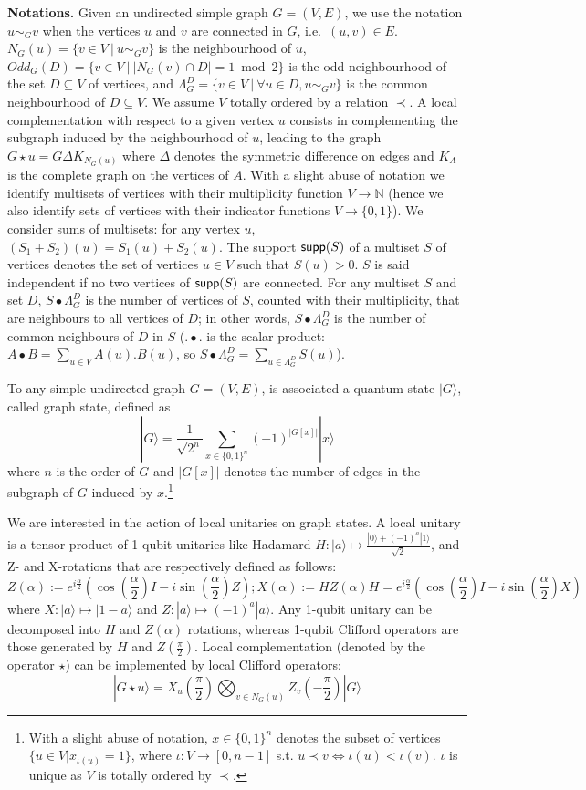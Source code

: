 \documentclass[a4paper,UKenglish,cleveref,autoref,thm-restate]{arxiv}
\newcommand{\ket}[1]{  |{#1} \rangle} \newcommand{\bra}[1]{ \left \langle#1\right | }
\renewcommand{\iff}{\Leftrightarrow}
\newcommand{\supp}{\textup{\textsf{supp}}}
\renewcommand{\iff}{\Leftrightarrow}
\renewcommand{\iff}{\Leftrightarrow}
\begin{document}
{\bf Notations.} Given an undirected simple graph $G=(V,E)$, we use the notation $u\sim_G v$ when the vertices $u$ and $v$ are connected in $G$, i.e.~$(u,v)\in E$. $N_G(u)=\{v\in V~|~u\sim_G v\}$ is the neighbourhood of $u$, $Odd_G(D) = \{v \in V~|~|N_G(v)\cap D|=1\bmod 2\}$ is the odd-neighbourhood of the set $D\subseteq V$ of vertices, and $\Lambda _G^D = \{v\in V~|~ \forall u\in D, u\sim_G v\}$ is the common neighbourhood of $D\subseteq V$. We assume $V$  totally ordered by a relation $\prec$. A local complementation with respect to a given vertex $u$ consists in complementing the subgraph induced by the neighbourhood of $u$, leading to the graph $G\star u= G\Delta K_{N_G(u)}$ where $\Delta$ denotes the symmetric difference on edges and $K_A$ is the complete graph on the vertices of $A$. With a slight abuse of notation we identify multisets of vertices with their multiplicity function $V\to \mathbb N$ (hence we also identify sets of vertices with their indicator functions $V\to \{0,1\}$). We consider sums of multisets: for any vertex $u$, $(S_1+ S_2)(u) = S_1(u)+S_2(u)$. The support $\supp(S)$ of a multiset $S$ of vertices denotes the set of vertices $u \in V$ such that $S(u) > 0$. $S$ is said independent if no two vertices of $\supp(S)$ are connected.
For any multiset $S$ and set $D$, $S\bullet \Lambda_G^D$ is the number of vertices of $S$, counted with their multiplicity, that are neighbours to all vertices of $D$;  in other words, $S\bullet \Lambda_G^D$ is  the number of common neighbours of $D$ in $S$ ($.\bullet.$ is the scalar product: $A\bullet B = \sum_{u\in V}A(u).B(u)$, so $S\bullet \Lambda_G^D = \sum_{u \in \Lambda_G^D}S(u)$).


To any simple undirected graph $G=(V,E)$, is associated a quantum state $\ket G$, called graph state, defined as $$\ket G = \frac 1{\sqrt {2^n}}\sum_{x\in \{0,1\}^n}(-1)^{|G[x]|}\ket x$$ 
where $n$ is the order of $G$ and $|G[x]|$ denotes the number of edges in the subgraph of $G$ induced by $x$.\footnote{With a slight abuse of notation, $x\in \{0,1\}^n$ denotes the subset of vertices $\{u \in V | x_{\iota(u)} = 1\}$, where $\iota:V\to [0,n-1]$ s.t. $u\prec v\iff \iota(u)<\iota(v)$. $\iota$ is unique as $V$ is totally ordered by $\prec$.}


We are interested in the action of local unitaries on graph states. A local unitary is a tensor product of 1-qubit unitaries like Hadamard $H:\ket{a}\mapsto \frac{\ket 0+(-1)^a\ket1}{\sqrt 2}$, and Z- and X-rotations that are respectively defined as follows:
$$Z(\alpha)\!:=e^{i\frac \alpha2}\left(\cos\left(\frac \alpha2\right)I-i\sin\left(\frac \alpha2\right)Z\right); X(\alpha)\!:=HZ(\alpha)H=e^{i\frac \alpha2}\left(\cos\left(\frac \alpha2\right)I-i\sin\left(\frac \alpha2\right)X\right)$$
where  $X:\ket a\mapsto \ket {1-a}$ and $Z:\ket a \mapsto (-1)^a\ket a$.
Any 1-qubit unitary can be decomposed into $H$ and $Z(\alpha)$ rotations, whereas 1-qubit Clifford operators are those generated by $H$ and $Z(\frac \pi 2)$. Local complementation (denoted by the operator $\star$) can be implemented by local Clifford operators: 
$$\ket{G\star u} = X_u\left(\frac \pi {2}\right)\bigotimes_{v\in N_G(u)}Z_v\left(-\frac \pi {2}\right)\ket{G}$$
\end{document}
